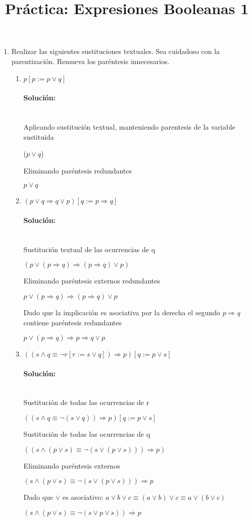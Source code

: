 \documentclass{article}
\author{}
\title{Práctica: Expresiones Booleanas 1}
\newcommand{\myparagraph}[1]{\paragraph{#1}\mbox{}\\}
\begin{document}
\maketitle

\begin{enumerate}
    \item Realizar las siguientes sustituciones textuales. Sea cuidadoso con la parentización. Remueva
los paréntesis innecesarios.

	\begin{enumerate}
		\setlength\itemsep{1em}
		\item $p[p := p \lor q]$
			\myparagraph{Solución:}
			\textlangle{} Aplicando sustitución textual, manteniendo parentesis de la variable sustituida \textrangle\par
			($p \lor q$)\par
			\textlangle{} Eliminando paréntesis redundantes \textrangle\par
			$p \lor q$\par

		\item $(p \lor q \Rightarrow q \lor p)[q := p \Rightarrow q]$
			\myparagraph{Solución:}
			\textlangle{} Sustitución textual de las ocurrencias de q \textrangle\par
			$(p \lor (p \Rightarrow q) \Rightarrow (p \Rightarrow q) \lor p)$\par
			\textlangle{} Eliminando paréntesis externos redundantes \textrangle\par
			$p \lor (p \Rightarrow q) \Rightarrow (p \Rightarrow q) \lor p$\par
			\textlangle{} Dado que la implicación es asociativa por la derecha el segundo \(p \Rightarrow q\) contiene paréntesis redundantes \textrangle\par
			$p \lor (p \Rightarrow q) \Rightarrow p \Rightarrow q \lor p$\par

		\item $((s \land q \equiv \neg r[r := s \lor q]) \Rightarrow p)[q := p \lor s]$
			\myparagraph{Solución:}
			\textlangle{} Sustitución de todas las ocurrencias de r \textrangle\par
			$((s \land q \equiv \neg (s \lor q)) \Rightarrow p)[q := p \lor s]$\par
			\textlangle{} Sustitución de todas las ocurrencias de q \textrangle\par
			$((s \land (p \lor s) \equiv \neg (s \lor (p \lor s))) \Rightarrow p)$\par
			\textlangle{} Eliminando paréntesis externos \textrangle\par
			$(s \land (p \lor s) \equiv \neg (s \lor (p \lor s))) \Rightarrow p$\par
			\textlangle{} Dado que \( \lor \) es asociativo: \(a \lor b \lor c \equiv ( a \lor b ) \lor c \equiv  a \lor (b  \lor c)\) \textrangle\par
			$(s \land (p \lor s) \equiv \neg (s \lor p \lor s)) \Rightarrow p$\par


\end{enumerate}
\end{enumerate}
\end{document}
